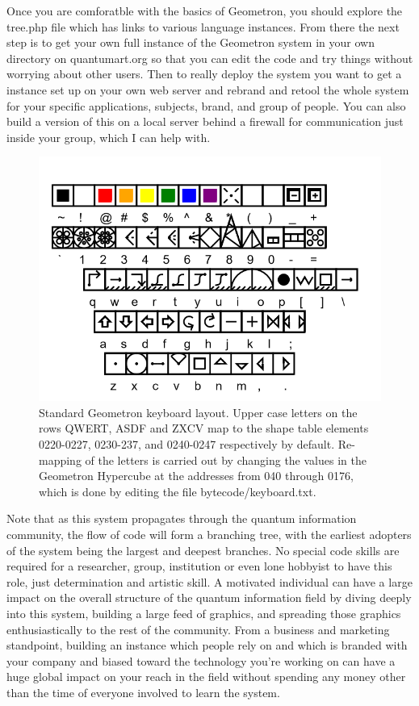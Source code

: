 \documentclass[11pt]{article}
\begin{document}
Once you are comforatble with the basics of Geometron, you should explore the tree.php file which has links to various language instances.  From there the next step is to get your own full instance of the Geometron system in your own directory on quantumart.org so that you can edit the code and try things without worrying about other users.  Then to really deploy the system you want to get a instance set up on your own web server and rebrand and retool the whole system for your specific applications, subjects, brand, and group of people.  You can also build a version of this on a local server behind a firewall for communication just inside your group, which I can help with.  

\begin{figure}

\includegraphics[width=\linewidth]{figures/figure_keyboard.png}

\caption{Standard Geometron keyboard layout. Upper case letters on the rows QWERT, ASDF and ZXCV map to the shape table elements 0220-0227, 0230-237, and 0240-0247 respectively by default.  Re-mapping of the letters is carried out by changing the values in the Geometron Hypercube at the addresses from 040 through 0176, which is done by editing the file bytecode/keyboard.txt.}
\end{figure}

Note that as this system propagates through the quantum information community, the flow of code will form a branching tree, with the earliest adopters of the system being the largest and deepest branches.  No special code skills are required for a researcher, group, institution or even lone hobbyist to have this role, just determination and artistic skill.  A motivated individual can have a large impact on the overall structure of the quantum information field by diving deeply into this system, building a large feed of graphics, and spreading those graphics enthusiastically to the rest of the community.  From a business and marketing standpoint, building an instance which people rely on  and which is branded with your company and biased toward the technology you're working on can have a huge global impact on your reach in the field without spending any money other than the time of everyone involved to learn the system.  
\end{document}
